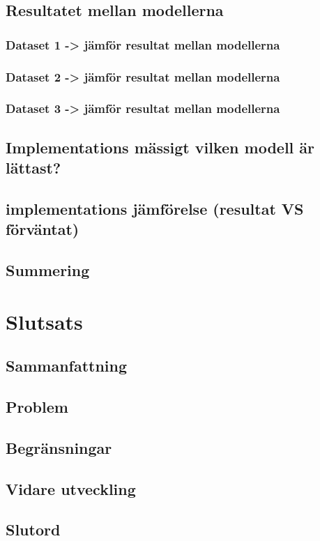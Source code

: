 \documentclass{kaumasters} %
\begin{document}
\section{Resultatet mellan modellerna}
\subsection{Dataset 1 -> jämför resultat mellan modellerna}
\subsection{Dataset 2 -> jämför resultat mellan modellerna}
\subsection{Dataset 3 -> jämför resultat mellan modellerna}
\section{Implementations mässigt vilken modell är lättast?}
\section{implementations jämförelse (resultat VS förväntat)}
\section{Summering}

\newpage

\chapter{Slutsats}
\section{Sammanfattning}
\section{Problem}
\section{Begränsningar}
\section{Vidare utveckling}
\section{Slutord}

\restoregeometry%
\end{document}
